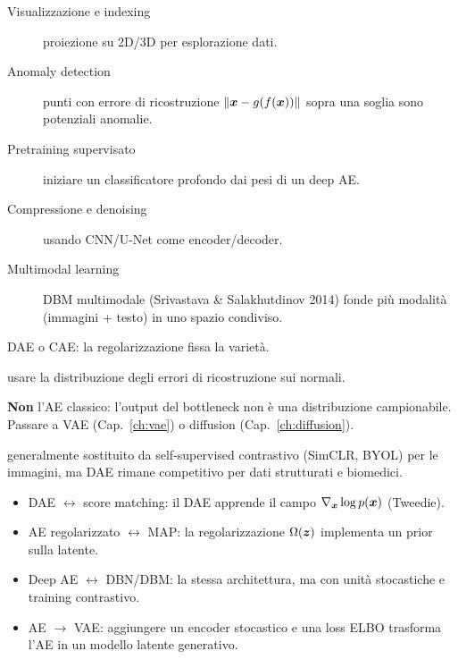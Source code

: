 \begin{description}
  \item[Visualizzazione e indexing] proiezione su 2D/3D per esplorazione dati.
  \item[Anomaly detection] punti con errore di ricostruzione $\|\bm{x} - g(f(\bm{x}))\|$ sopra una soglia sono potenziali anomalie.
  \item[Pretraining supervisato] iniziare un classificatore profondo dai pesi di un deep AE.
  \item[Compressione e denoising] usando CNN/U-Net come encoder/decoder.
  \item[Multimodal learning] DBM multimodale (Srivastava \& Salakhutdinov 2014) fonde più modalità (immagini + testo) in uno spazio condiviso.
\end{description}

\begin{tcolorbox}[mybox, title={Quando usare un autoencoder}]
\begin{description}[leftmargin=4em,style=nextline]
  \item[Si vuole una rappresentazione compatta non supervisionata] DAE o CAE: la regolarizzazione fissa la varietà.
  \item[Anomaly detection] usare la distribuzione degli errori di ricostruzione sui normali.
  \item[Generazione di qualità] \textbf{Non} l'AE classico: l'output del bottleneck non è una distribuzione campionabile. Passare a VAE (Cap.~\ref{ch:vae}) o diffusion (Cap.~\ref{ch:diffusion}).
  \item[Pretraining moderno] generalmente sostituito da self-supervised contrastivo (SimCLR, BYOL) per le immagini, ma DAE rimane competitivo per dati strutturati e biomedici.
\end{description}
\end{tcolorbox}

\begin{tcolorbox}[mybox, title={Connessioni}]
\begin{itemize}
  \item DAE $\leftrightarrow$ score matching: il DAE apprende il campo $\nabla_{\bm{x}} \log p(\bm{x})$ (Tweedie).
  \item AE regolarizzato $\leftrightarrow$ MAP: la regolarizzazione $\Omega(\bm{z})$ implementa un prior sulla latente.
  \item Deep AE $\leftrightarrow$ DBN/DBM: la stessa architettura, ma con unità stocastiche e training contrastivo.
  \item AE $\to$ VAE: aggiungere un encoder stocastico e una loss ELBO trasforma l'AE in un modello latente generativo.
\end{itemize}
\end{tcolorbox}

